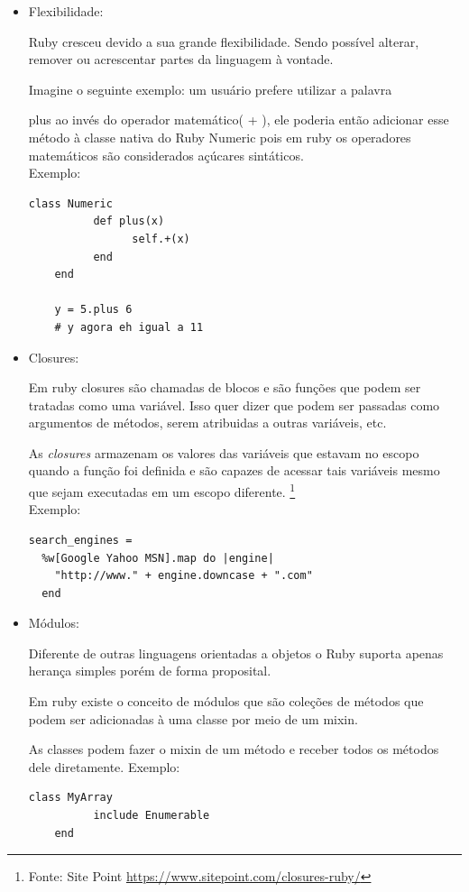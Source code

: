 \begin{itemize}
\item{Flexibilidade:}
    \par Ruby cresceu devido a sua grande flexibilidade. Sendo possível alterar, remover ou acrescentar partes da linguagem à vontade.
    \par Imagine o seguinte exemplo: um usuário prefere utilizar a palavra \par{plus} ao invés do operador matemático(  +  ), ele poderia então adicionar esse método à classe nativa do Ruby Numeric pois em ruby os operadores matemáticos são considerados açúcares sintáticos.
\\Exemplo:
\begin{lstlisting}[frame=single]
class Numeric
          def plus(x)
                self.+(x)
          end
    end

    y = 5.plus 6
    # y agora eh igual a 11
\end{lstlisting}
\item{Closures:}
    \par Em ruby closures são chamadas de blocos e são funções que podem ser tratadas como uma variável. Isso quer dizer que podem ser passadas como argumentos de métodos, serem atribuidas a outras variáveis, etc.
    \par As \emph{closures} armazenam os valores das variáveis que estavam no escopo quando a função foi definida e são capazes de acessar tais variáveis mesmo que sejam executadas em um escopo diferente. \footnote{Fonte: Site Point \url{https://www.sitepoint.com/closures-ruby/}}
\\
Exemplo:
\begin{lstlisting}[frame=single]
search_engines =
  %w[Google Yahoo MSN].map do |engine|
    "http://www." + engine.downcase + ".com"
  end
\end{lstlisting}
\item{Módulos:}
    \par Diferente de outras linguagens orientadas a objetos o Ruby suporta apenas herança simples porém de forma proposital. 
    \par Em ruby existe o conceito de módulos que são coleções de métodos que podem ser adicionadas à uma classe por meio de um mixin.
    \par As classes podem fazer o mixin de um método e receber todos os métodos dele diretamente.
Exemplo:
\begin{lstlisting}[frame=single]
class MyArray
          include Enumerable
    end
\end{lstlisting}

\end{itemize}
